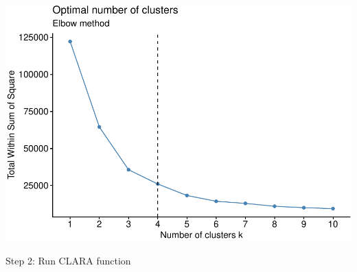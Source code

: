 \documentclass[12pt,twoside]{amherstthesis}
\begin{document}
  \begin{center}\includegraphics{Comps_Proj_files/figure-latex/unnamed-chunk-4-1} \end{center}
  
  Step 2: Run CLARA function
  
  \begin{Shaded}
  \begin{Highlighting}[]
  \StringTok{ }\NormalTok{(new[}\OperatorTok{:}\NormalTok{], }\NormalTok{)}
  \end{Highlighting}
  \end{Shaded}
  
  \begin{Shaded}
  \begin{Highlighting}[]
  \end{Highlighting}
  \end{Shaded}
  
\end{document}
